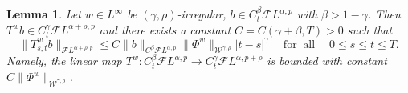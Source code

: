 \documentclass[10pt]{article}
\newcommand{\tmop}[1]{\ensuremath{\operatorname{#1}}}
\newtheorem{lemma}[theorem]{Lemma}
\begin{document}
\begin{lemma}
  \label{sec2.2 lemma averaging time}Let $w \in L^{\infty}$ be $(\gamma,
  \rho)$\mbox{-}irregular, $b \in C^{\beta}_t \mathcal{F} L^{\alpha, p}$ with
  $\beta > 1 - \gamma$. Then $T^w b \in C^{\gamma}_t \mathcal{F} L^{\alpha +
  \rho, p}$ and there exists a constant $C = C (\gamma + \beta, T) > 0$ such
  that
  \begin{equation}
    \| T^w_{s, t} b \|_{\mathcal{F} L^{\alpha + \rho, p}} \leqslant C \| b
    \|_{C^{\beta} \mathcal{F} L^{\alpha, p}} \| \Phi^w
    \|_{\mathcal{W}^{\gamma, \rho}} | t - s |^{\gamma} \quad \tmop{for}
    \tmop{all} \quad 0 \leqslant s \leqslant t \leqslant T. \label{sec2.2
    lemma time eq1}
  \end{equation}
  Namely, the linear map $T^w : C^{\beta}_t \mathcal{F} L^{\alpha, p}
  \rightarrow C^{\gamma}_t \mathcal{F} L^{\alpha, p + \rho}$ is bounded with
  constant $C \| \Phi^w \|_{\mathcal{W}^{\gamma, \rho}}$.
\end{lemma}
\end{document}
